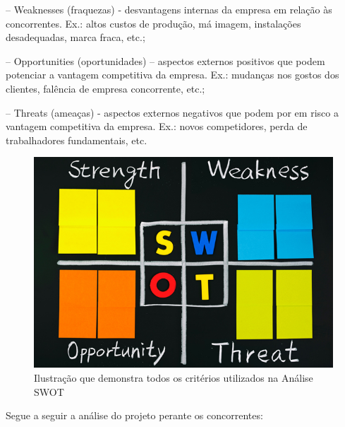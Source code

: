 \documentclass[graduacao,brazil]{ThesisPUC}
\begin{document}
-- Weaknesses (fraquezas) - desvantagens internas da empresa em relação às concorrentes.
Ex.: altos custos de produção, má imagem, instalações desadequadas, marca fraca, etc.;

-- Opportunities (oportunidades) – aspectos externos positivos que podem potenciar a
vantagem competitiva da empresa. Ex.: mudanças nos gostos dos clientes, falência de
empresa concorrente, etc.;

-- Threats (ameaças) - aspectos externos negativos que podem por em risco a vantagem
competitiva da empresa. Ex.: novos competidores, perda de trabalhadores fundamentais,
etc.

\begin{figure}[H]
    \centering
    \includegraphics[width=\linewidth]{Imagens/swot.jpg}
    \caption{Ilustração que demonstra todos os critérios utilizados na Análise SWOT}
\end{figure}

Segue a seguir a an\'{a}lise do projeto perante os concorrentes:
\end{document}
